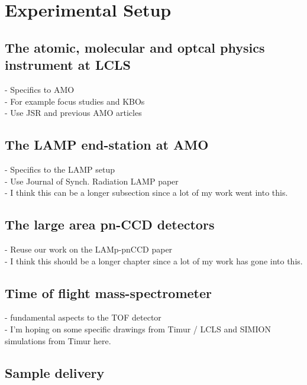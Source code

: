 \chapter{Experimental Setup}\label{ch:exp_setup}
\section{The atomic, molecular and optcal physics instrument at LCLS}
- Specifics to AMO\\
- For example focus studies and KBOs\\
- Use JSR and previous AMO articles
\section{The LAMP end-station at AMO}
- Specifics to the LAMP setup\\
- Use Journal of Synch. Radiation LAMP paper\\
- I think this can be a longer subsection since a lot of my work went into this.
\section{The large area pn-CCD detectors}
- Reuse our work on the LAMp-pnCCD paper\\
- I think this should be a longer chapter since a lot of my work has gone into this.
\section{Time of flight mass-spectrometer}
- fundamental aspects to the TOF detector\\
- I'm hoping on some specific drawings from Timur / LCLS and SIMION simulations from Timur here.
\section{Sample delivery}
